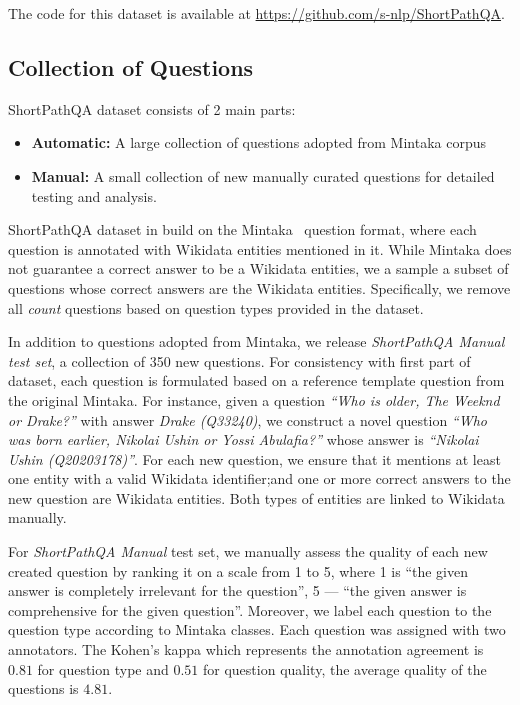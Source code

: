 The code for this dataset is available at \url{https://github.com/s-nlp/ShortPathQA}.

\subsection{Collection of Questions}\label{subsec:question_collection}

ShortPathQA dataset consists of 2 main parts: 
\begin{itemize}
    \item \textbf{Automatic:} A large collection of questions adopted from Mintaka corpus~\cite{DBLP:conf/coling/SenAS22-mintaka} 
    \item \textbf{Manual:} A small collection of new manually curated questions for detailed testing and analysis. 
\end{itemize}

ShortPathQA dataset in build on the Mintaka~\cite{DBLP:conf/coling/SenAS22-mintaka} question format, where each question is annotated with Wikidata entities mentioned in it. While Mintaka does not guarantee a correct answer to be a Wikidata entities, we a sample a subset of questions whose correct answers are the Wikidata entities. Specifically, we remove all \textit{count} questions based on question types provided in the dataset. 

In addition to questions adopted from Mintaka, we release \textit{ShortPathQA Manual test set}, a collection of 350 new questions. For consistency with first part of dataset, each question is formulated based on a reference template question from the original Mintaka.  For instance, given a question \textit{``Who is older, The Weeknd or Drake?''} with answer \textit{Drake (Q33240)}, we construct a novel question \textit{``Who was born earlier, Nikolai Ushin or Yossi Abulafia?''} whose answer is \textit{``Nikolai Ushin (Q20203178)''}. 
For each new question, we ensure that it mentions at least one entity with a valid Wikidata identifier;and one or more correct answers to the new question are Wikidata entities. Both types of entities are linked to Wikidata manually.

For \textit{ShortPathQA Manual} test set,  we manually assess the quality of each new created question by ranking it on a scale from 1 to 5, where 1 is ``the given answer is completely irrelevant for the question'', 5 --- ``the given answer is comprehensive for  the given question''. Moreover, we label each question to the question type according to Mintaka classes. Each question was assigned with two annotators. The Kohen's kappa which represents the annotation agreement is $0.81$ for question type and $0.51$ for question quality, the average quality of the questions is $4.81$.


